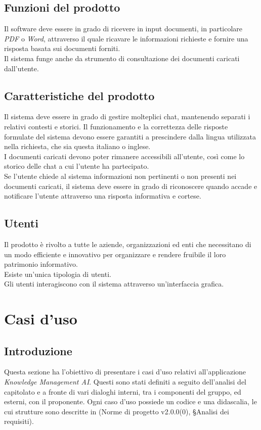\documentclass[10pt, a4paper]{article}
\begin{document}
\subsection{Funzioni del prodotto}
Il software deve essere in grado di ricevere in input documenti, in particolare \textit{PDF} o \textit{Word}, attraverso il quale ricavare le informazioni richieste e fornire una risposta basata sui documenti forniti.\\
Il sistema funge anche da strumento di consultazione dei documenti caricati dall'utente.
\subsection{Caratteristiche del prodotto}
Il sistema deve essere in grado di gestire molteplici chat, mantenendo separati i relativi contesti e storici. 
Il funzionamento e la correttezza delle risposte formulate del sistema devono essere garantiti a prescindere dalla lingua utilizzata nella richiesta, che sia questa italiano o inglese.\\
I documenti caricati devono poter rimanere accessibili all'utente, così come lo storico delle chat a cui l'utente ha partecipato.\\
Se l'utente chiede al sistema informazioni non pertinenti o non presenti nei documenti caricati, il sistema deve essere in grado di riconoscere quando accade e notificare l'utente attraverso una risposta informativa e cortese.
\subsection{Utenti}
Il prodotto è rivolto a tutte le aziende, organizzazioni ed enti che necessitano di un modo efficiente e innovativo per organizzare e rendere fruibile il loro patrimonio informativo.\\
Esiste un'unica tipologia di utenti.\\
Gli utenti interagiscono con il sistema attraverso un'interfaccia grafica.
\newpage

\section{Casi d'uso}

\subsection{Introduzione}
Questa sezione ha l'obiettivo di presentare i casi d'uso relativi all'applicazione \textit{Knowledge Management AI}. Questi sono stati definiti a seguito dell'analisi del capitolato e a fronte di vari dialoghi interni, tra i componenti del gruppo, ed esterni, con il proponente. Ogni caso d'uso possiede un codice e una didascalia, le cui strutture sono descritte in (Norme di progetto v2.0.0(0), \S Analisi dei requisiti).
\end{document}

